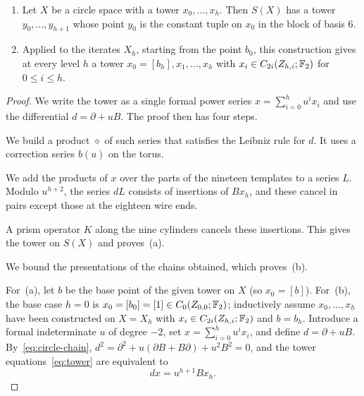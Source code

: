\begin{lemma}\label{lem:square-tower}
\leavevmode
\begin{enumerate}
\item[(a)] Let $X$ be a circle space with a tower $x_0,\ldots,x_h$. Then $S(X)$ has a tower $y_0,\ldots,y_{h+1}$ whose point $y_0$ is the constant tuple on $x_0$ in the block of basis $6$.
\item[(b)] Applied to the iterates $X_h$, starting from the point $b_0$, this construction gives at every level $h$ a tower $x_0=[b_h],x_1,\ldots,x_h$ with $x_i\in C_{2i}(Z_{h,i};\mathbb F_2)$ for $0\le i\le h$.
\end{enumerate}
\end{lemma}
\begin{proof}
We write the tower as a single formal power series $x=\sum_{i=0}^h u^i x_i$ and use the differential $d=\partial+uB$. The proof then has four steps.
\begin{list}{}{\setlength{\labelwidth}{3.2em}\setlength{\labelsep}{0.6em}\setlength{\leftmargin}{3.8em}\setlength{\itemsep}{2pt}\setlength{\parsep}{0pt}\setlength{\topsep}{4pt}}
\item[Step 1.] We build a product $\diamond$ of such series that satisfies the Leibniz rule for $d$. It uses a correction series $b(u)$ on the torus.
\item[Step 2.] We add the products of $x$ over the parts of the nineteen templates to a series $L$. Modulo $u^{h+2}$, the series $dL$ consists of insertions of $Bx_h$, and these cancel in pairs except those at the eighteen wire ends.
\item[Step 3.] A prism operator $K$ along the nine cylinders cancels these insertions. This gives the tower on $S(X)$ and proves~(a).
\item[Step 4.] We bound the presentations of the chains obtained, which proves~(b).
\end{list}

For~(a), let $b$ be the base point of the given tower on $X$ (so $x_0=[b]$). For~(b), the base case $h=0$ is $x_0=[b_0]=[1]\in C_0(Z_{0,0};\mathbb F_2)$; inductively assume $x_0,\ldots,x_h$ have been constructed on $X=X_h$ with $x_i\in C_{2i}(Z_{h,i};\mathbb F_2)$ and $b=b_h$. Introduce a formal indeterminate $u$ of degree $-2$, set $x=\sum_{i=0}^h u^i x_i$, and define $d=\partial+uB$. By~\eqref{eq:circle-chain}, $d^2=\partial^2+u(\partial B+B\partial)+u^2 B^2=0$, and the tower equations~\eqref{eq:tower} are equivalent to
\[
 dx=u^{h+1}Bx_h.
\]


\end{proof}
